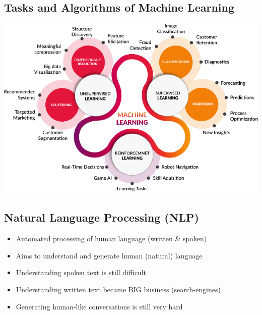\subsection{Tasks and Algorithms of Machine Learning}
\includegraphics[width=\linewidth]{./img/machine_learning_sections.png}

\subsection{Natural Language Processing (NLP)}
\begin{itemize}
    \item Automated processing of human language (written \& spoken)
    \item Aims to understand and generate human (natural) language
    \item Understanding spoken text is still difficult
    \item Understanding written text became BIG business (search-engines)
    \item Generating human-like conversations is still very hard
\end{itemize}

